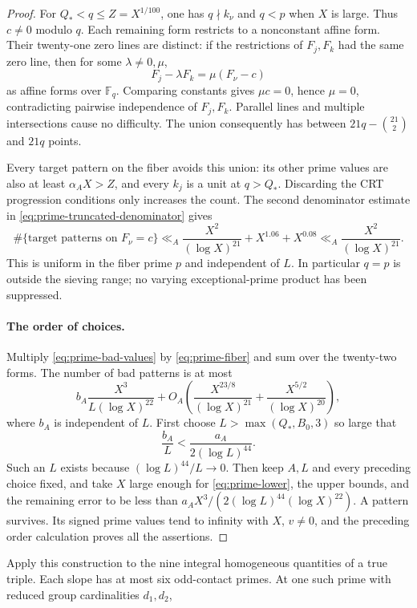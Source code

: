 \documentclass[11pt]{article}
\theoremstyle{definition}
\theoremstyle{remark}
\begin{document}
\begin{proof}
For $Q_*<q\le Z=X^{1/100}$, one has $q\nmid k_\nu$ and
$q<p$ when $X$ is large. Thus $c\ne0$ modulo $q$. Each remaining
form restricts to a nonconstant affine form. Their twenty-one
zero lines are distinct: if the restrictions of $F_j,F_k$ had
the same zero line, then for some $\lambda\ne0,\mu$,
\[
 F_j-\lambda F_k=\mu(F_\nu-c)
\]
as affine forms over $\mathbb F_q$. Comparing constants gives
$\mu c=0$, hence $\mu=0$, contradicting pairwise independence
of $F_j,F_k$. Parallel lines and multiple intersections cause
no difficulty. The union consequently has between
$21q-\binom{21}{2}$ and $21q$ points.

Every target pattern on the fiber avoids this union: its other
prime values are also at least $\alpha_A X>Z$, and every
$k_j$ is a unit at $q>Q_*$. Discarding the CRT progression
conditions only increases the count. The second denominator
estimate in \eqref{eq:prime-truncated-denominator} gives
\begin{equation}\label{eq:prime-fiber}
 \#\{\text{target patterns on }F_\nu=c\}
 \ll_A \frac{X^2}{(\log X)^{21}}+X^{1.06}+X^{0.08}
 \ll_A \frac{X^2}{(\log X)^{21}}.
\end{equation}
This is uniform in the fiber prime $p$ and independent of $L$.
In particular $q=p$ is outside the sieving range; no varying
exceptional-prime product has been suppressed.

\paragraph{The order of choices.}
Multiply \eqref{eq:prime-bad-values} by \eqref{eq:prime-fiber}
and sum over the twenty-two forms. The number of bad patterns
is at most
\[
 b_A\frac{X^3}{L(\log X)^{22}}
 +O_A\left(\frac{X^{23/8}}{(\log X)^{21}}
          +\frac{X^{5/2}}{(\log X)^{20}}\right),
\]
where $b_A$ is independent of $L$. First choose
$L>\max(Q_*,B_0,3)$ so large that
\[
 \frac{b_A}{L}<\frac{a_A}{2(\log L)^{44}}.
\]
Such an $L$ exists because $(\log L)^{44}/L\to0$.
Then keep $A,L$ and every preceding choice fixed, and take $X$
large enough for \eqref{eq:prime-lower}, the upper bounds, and
the remaining error to be less than
$a_A X^3/(2(\log L)^{44}(\log X)^{22})$.
A pattern survives. Its signed prime values tend to infinity
with $X$, $v\ne0$, and the preceding order calculation proves
all the assertions.
\end{proof}
Apply this construction to the nine integral homogeneous quantities
of a true triple. Each slope has at most six odd-contact primes.
At one such prime with reduced group cardinalities $d_1,d_2$,
\end{document}
